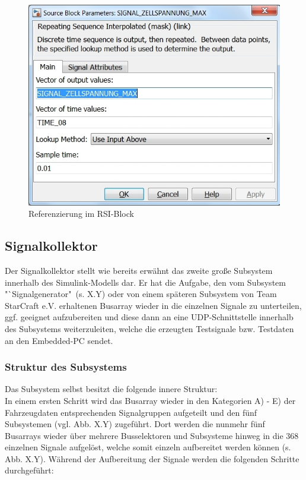 \documentclass[fontsize = 12pt, paper = a4]{scrreprt}
\begin{document}
\begin{figure}[h]
\centering
\includegraphics[scale = 0.75]{referenz}
\caption{Referenzierung im RSI-Block}
\end{figure}


\subsection{Signalkollektor}

Der Signalkollektor stellt wie bereits erwähnt das zweite große Subsystem innerhalb des Simulink-Modells dar. Er hat die Aufgabe, den vom Subsystem "`Signalgenerator"\ (s. X.Y) oder von einem späteren Subsystem von Team StarCraft e.V. erhaltenen Busarray wieder in die einzelnen Signale zu unterteilen, ggf. geeignet aufzubereiten und diese dann an eine UDP-Schnittstelle innerhalb des Subsystems weiterzuleiten, welche die erzeugten Testsignale bzw. Testdaten an den Embedded-PC sendet.  

\subsubsection{Struktur des Subsystems}

Das Subsystem selbst besitzt die folgende innere Struktur: \\
In einem ersten Schritt wird das Busarray wieder in den Kategorien A) - E) der Fahrzeugdaten entsprechenden Signalgruppen aufgeteilt und den fünf Subsystemen (vgl. Abb. X.Y) zugeführt. Dort werden die nunmehr fünf Busarrays wieder über mehrere Busselektoren und Subsysteme hinweg in die 368 einzelnen Signale aufgelöst, welche somit einzeln aufbereitet werden können (s. Abb. X.Y). Während der Aufbereitung der Signale werden die folgenden Schritte durchgeführt:
\end{document}
